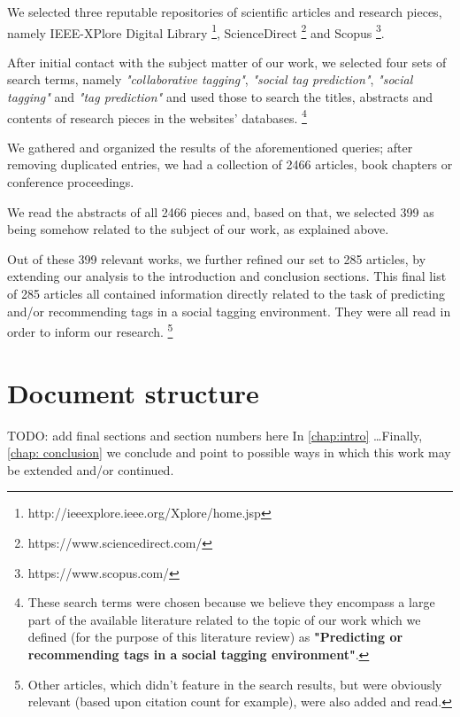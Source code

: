 We selected three reputable repositories of scientific articles and research pieces, namely IEEE-XPlore Digital Library \footnote{http://ieeexplore.ieee.org/Xplore/home.jsp}, ScienceDirect \footnote{https://www.sciencedirect.com/} and Scopus \footnote{https://www.scopus.com/}.

After initial contact with the subject matter of our work, we selected four sets of search terms, namely \textit{"collaborative tagging"}, \textit{"social tag prediction"}, \textit{"social tagging"} and \textit{"tag prediction"} and used those to search the titles, abstracts and contents of research pieces in the websites' databases. \footnote{These search terms were chosen because we believe they encompass a large part  of the available literature related to the topic of our work which we defined (for the purpose of this literature review) as \textbf{"Predicting or recommending tags in a social tagging environment"}.} 

We gathered and organized the results of the aforementioned queries; after removing duplicated entries, we had a collection of 2466 articles, book chapters or conference proceedings.

We read the abstracts of all 2466 pieces and, based on that, we selected 399 as being somehow related to the subject of our work, as explained above.

Out of these 399 relevant works, we further refined our set to 285 articles, by extending our analysis to the introduction and conclusion sections. This final list of 285 articles all contained information directly related to the task of predicting and/or recommending tags in a social tagging environment. They were all read in order to inform our research. \footnote{Other articles, which didn't feature in the search results, but were obviously relevant (based upon citation count for example), were also added and read.}


\section{Document structure}\label{section:intro_structure}

{\color{red} TODO: add final sections and section numbers here In \autoref{chap:intro} \ldots Finally, \autoref{chap: conclusion} we conclude and point to possible ways in which this work may be extended and/or continued.}



